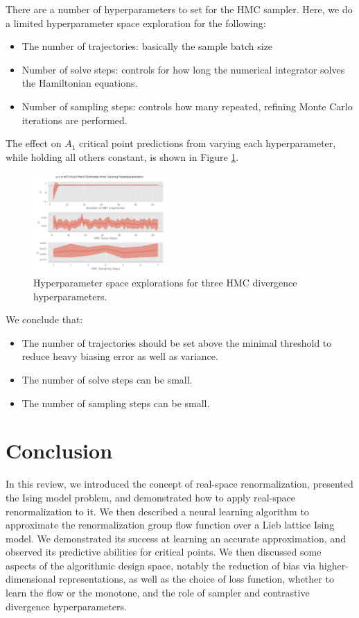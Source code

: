 \documentclass[%
    reprint,
    amsmath,amssymb,
    aps,
]{revtex4-2}
\begin{document}
There are a number of hyperparameters to set for the HMC sampler. 
Here, we do a limited hyperparameter space exploration for the following:
\begin{itemize}
    \item The number of trajectories: basically the sample batch size
    \item Number of solve steps: controls for how long the numerical integrator solves the Hamiltonian equations. 
    \item Number of sampling steps: controls how many repeated, refining Monte Carlo iterations are performed. 
\end{itemize}
The effect on $A_1$ critical point predictions from varying each hyperparameter, while holding all others constant, is shown in Figure \ref{fig:hmc-hyperparameters}. 

\begin{figure}[h]
    \includegraphics[width=0.45\textwidth]{tex/images/hmc-hyperparameters.png}
    \caption{\label{fig:hmc-hyperparameters}
        Hyperparameter space explorations for three HMC divergence hyperparameters. 
    }
\end{figure}

We conclude that:
\begin{itemize}
    \item The number of trajectories should be set above the minimal threshold to reduce heavy biasing error as well as variance. 
    \item The number of solve steps can be small. 
    \item The number of sampling steps can be small. 
\end{itemize}

\section{Conclusion}

In this review, we introduced the concept of real-space renormalization, presented the Ising model problem, and demonstrated how to apply real-space renormalization to it.
We then described a neural learning algorithm to approximate the renormalization group flow function over a Lieb lattice Ising model. 
We demonstrated its success at learning an accurate approximation, and observed its predictive abilities for critical points. 
We then discussed some aspects of the algorithmic design space, notably the reduction of bias via higher-dimensional representations, as well as the choice of loss function, whether to learn the flow or the monotone, and the role of sampler and contrastive divergence hyperparameters. 
\end{document}
